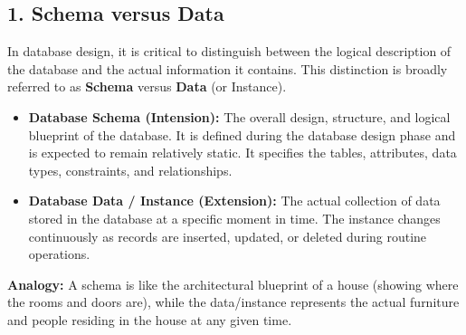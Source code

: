 \documentclass[12pt,a3paper]{article}
\begin{document}
\begin{enumerate}
\begin{tcolorbox}[enhanced,breakable,ansbox,colback=cA!4,colframe=cA,boxrule=0.8pt,arc=5pt,title={\textbf{Answer}},fonttitle=\bfseries\color{white},colbacktitle=cA]
\subsection*{1. Schema versus Data}

In database design, it is critical to distinguish between the logical description of the database and the actual information it contains. This distinction is broadly referred to as \textbf{Schema} versus \textbf{Data} (or Instance).

\begin{itemize}
    \item \textbf{Database Schema (Intension):} The overall design, structure, and logical blueprint of the database. It is defined during the database design phase and is expected to remain relatively static. It specifies the tables, attributes, data types, constraints, and relationships.
    \item \textbf{Database Data / Instance (Extension):} The actual collection of data stored in the database at a specific moment in time. The instance changes continuously as records are inserted, updated, or deleted during routine operations.
\end{itemize}

\textbf{Analogy:} A schema is like the architectural blueprint of a house (showing where the rooms and doors are), while the data/instance represents the actual furniture and people residing in the house at any given time.

\vspace{1em}
\begin{center}
\end{center}
\end{tcolorbox}
\end{enumerate}
\end{document}
